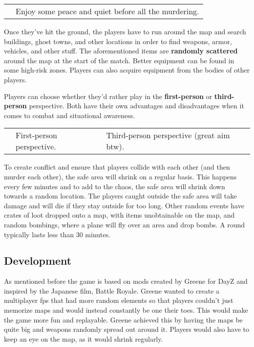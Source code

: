 \documentclass[a4paper,10pt]{book}
\begin{document}
 \begin{longtable}{p{1mm}|l|}\hline
 
 & 
 \\\hline
 
 & Enjoy some peace and quiet before all the murdering. 
 \\\hline
 \end{longtable}
 
        Once they've hit the ground, the players have to run around the map and search buildings, ghost towns, and other locations in order to find weapons, armor, vehicles, and other stuff.
        The aforementioned items are  \textbf{randomly scattered }  around the map at the start of the match. Better equipment can be found in some high-risk zones.
         Players can also acquire equipment from the bodies of other players.
       
 
        Players can choose whether they'd rather play in the  \textbf{first-person }  or  \textbf{third-person }  perspective.
        Both have their own advantages and disadvantages when it comes to combat and situational awareness.
       
 \begin{longtable}{p{1mm}|l|l|}\hline
 
 & 
 & 
 \\\hline
 
 & First-person perspective. 
 & Third-person perspective (great aim btw). 
 \\\hline
 \end{longtable}
 
        To create conflict and ensure that players collide with each other (and then murder each other), the safe area will shrink on a regular basis. This happens every few minutes and to add to the chaos, the safe area will shrink down towards a random location. The players caught outside the safe area will take damage and will die if they stay outside for too long. Other random events have crates of loot dropped onto a map, with items unobtainable on the map, and random bombings, where a plane will fly over an area and drop bombs. A round typically lasts less than 30 minutes.
       
 \subsection{Development }
 
        As mentioned before the game is based on mods created by Greene for DayZ and inspired by the Japanese film, Battle Royale. Greene wanted to create a multiplayer fps that had more random elements so that players couldn't just memorize maps and would instead constantly be one their toes. This would make the game more fun and replayable. Greene achieved this by having the maps be quite big and weapons randomly spread out around it. Players would also have to keep an eye on the map, as it would shrink regularly.
       
\end{document}
